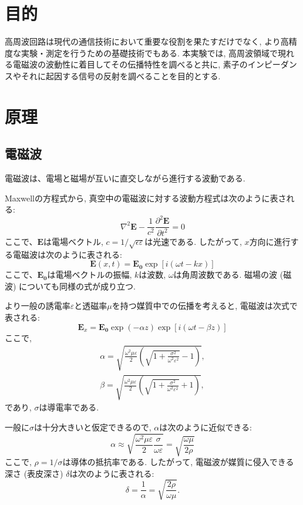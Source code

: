 \documentclass[uplatex,dvipdfmx,a4j,12pt]{jsarticle}
\begin{document}
\section{目的}
高周波回路は現代の通信技術において重要な役割を果たすだけでなく, より高精度な実験・測定を行うための基礎技術でもある.
本実験では, 高周波領域で現れる電磁波の波動性に着目してその伝播特性を調べると共に, 素子のインピーダンスやそれに起因する信号の反射を調べることを目的とする.

\section{原理}
\subsection{電磁波}
電磁波は、電場と磁場が互いに直交しながら進行する波動である.

Maxwellの方程式から, 真空中の電磁波に対する波動方程式は次のように表される:
\begin{equation}
    \nabla^2 \mathbf{E} - \frac{1}{c^2} \frac{\partial^2 \mathbf{E}}{\partial t^2} = 0
\end{equation}
ここで、$\mathbf{E}$は電場ベクトル, $c = 1/\sqrt{\epsilon\varepsilon}$は光速である.
したがって, $x$方向に進行する電磁波は次のように表される:
\begin{equation}
    \mathbf{E}(x,t) = \mathbf{E_0} \exp{[i(\omega t - kx)]}
\end{equation}
ここで、$\mathbf{E_0}$は電場ベクトルの振幅, $k$は波数, $\omega$は角周波数である.
磁場の波 (磁波) についても同様の式が成り立つ.

より一般の誘電率$\varepsilon$と透磁率$\mu$を持つ媒質中での伝播を考えると, 電磁波は次式で表される:
\begin{equation}
  \mathbf{E}_x = \mathbf{E_0}\exp{(-\alpha z)} \exp{[i(\omega t - \beta z)]}
\end{equation}
ここで, 
\begin{gather}
  \alpha = \sqrt{\frac{\omega^2 \mu \varepsilon}{2} \left(\sqrt{1 + \frac{\sigma^2}{\omega^2 \varepsilon^2}} - 1\right)}, \\
  \beta = \sqrt{\frac{\omega^2 \mu \varepsilon}{2} \left(\sqrt{1 + \frac{\sigma^2}{\omega^2 \varepsilon^2}} + 1\right)},
\end{gather}
であり, $\sigma$は導電率である.

一般に$\sigma$は十分大きいと仮定できるので, $\alpha$は次のように近似できる:
\begin{equation}
  \alpha \approx \sqrt{\frac{\omega^2 \mu \varepsilon}{2} \frac{\sigma}{\omega \varepsilon}} = \sqrt{\frac{\omega \mu}{2 \rho}}
\end{equation}
ここで, $\rho = 1 / \sigma$は導体の抵抗率である.
したがって, 電磁波が媒質に侵入できる深さ (表皮深さ) $\delta$は次のように表される:
\begin{equation}
  \delta = \frac{1}{\alpha} = \sqrt{\frac{2 \rho}{\omega \mu}}.
  \label{eq:skin_depth}
\end{equation}
\end{document}
